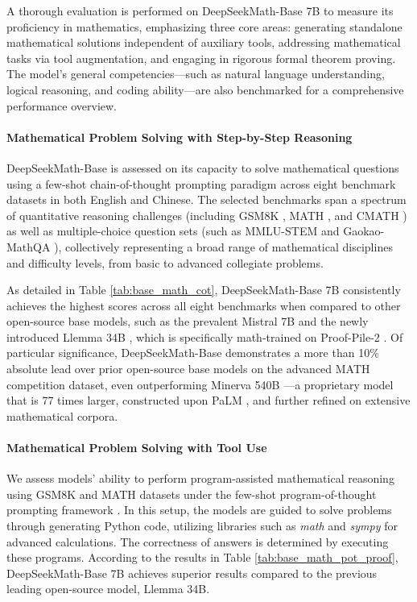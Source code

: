 A thorough evaluation is performed on DeepSeekMath-Base 7B to measure its proficiency in mathematics, emphasizing three core areas: generating standalone mathematical solutions independent of auxiliary tools, addressing mathematical tasks via tool augmentation, and engaging in rigorous formal theorem proving. The model's general competencies—such as natural language understanding, logical reasoning, and coding ability—are also benchmarked for a comprehensive performance overview.

\paragraph{Mathematical Problem Solving with Step-by-Step Reasoning}

DeepSeekMath-Base is assessed on its capacity to solve mathematical questions using a few-shot chain-of-thought prompting paradigm \citep{cot} across eight benchmark datasets in both English and Chinese. The selected benchmarks span a spectrum of quantitative reasoning challenges (including GSM8K \citep{gsm8k}, MATH \citep{MATH}, and CMATH \citep{wei2023cmath}) as well as multiple-choice question sets (such as MMLU-STEM \citep{mmlu} and Gaokao-MathQA \citep{agieval}), collectively representing a broad range of mathematical disciplines and difficulty levels, from basic to advanced collegiate problems.

As detailed in Table \ref{tab:base_math_cot}, DeepSeekMath-Base 7B consistently achieves the highest scores across all eight benchmarks when compared to other open-source base models, such as the prevalent Mistral 7B \citep{mistral} and the newly introduced Llemma 34B \citep{llemma}, which is specifically math-trained on Proof-Pile-2 \citep{llemma}. Of particular significance, DeepSeekMath-Base demonstrates a more than 10\% absolute lead over prior open-source base models on the advanced MATH competition dataset, even outperforming Minerva 540B \citep{minerva}—a proprietary model that is 77 times larger, constructed upon PaLM \citep{palm}, and further refined on extensive mathematical corpora.

\paragraph{Mathematical Problem Solving with Tool Use} 
We assess models’ ability to perform program-assisted mathematical reasoning using GSM8K and MATH datasets under the few-shot program-of-thought prompting framework \citep{pot,pal}. In this setup, the models are guided to solve problems through generating Python code, utilizing libraries such as \textit{math} and \textit{sympy} for advanced calculations. The correctness of answers is determined by executing these programs. According to the results in Table \ref{tab:base_math_pot_proof}, DeepSeekMath-Base 7B achieves superior results compared to the previous leading open-source model, Llemma 34B.

